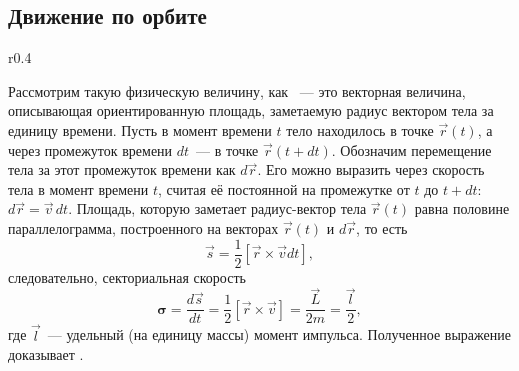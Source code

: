 \subsection{Движение по орбите}

\begin{wrapfigure}[8]{r}{0.4\tw}
	\centering
	\vspace{-0.75pc}
	\caption{}
\end{wrapfigure}
Рассмотрим такую физическую величину, как ~--- это векторная величина, описывающая ориентированную площадь, заметаемую радиус вектором тела за единицу времени. Пусть в момент времени $t$ тело находилось в точке $\vec{r}(t)$, а через промежуток времени $dt$~--- в точке $\vec{r}(t + dt)$. Обозначим перемещение тела за этот промежуток времени как $d\vec{r}$. Его можно выразить через скорость тела в момент времени $t$, считая её постоянной на промежутке от $t$ до $t + dt$: $d\vec{r} = \vec{v} \,d t$. Площадь, которую заметает радиус-вектор тела $\vec{r}(t)$ равна половине параллелограмма, построенного на векторах $\vec{r}(t)$ и $d\vec{r}$, то есть
\begin{equation*}
	\vec{s} = \frac{1}{2} [\vec{r} \times \vec{v} dt],
\end{equation*}
следовательно, секториальная скорость
\begin{equation*}
	\boldsymbol{\sigma} = \frac{d \vec{s}}{dt} = \frac{1}{2} [\vec{r} \times \vec{v}]  = \frac{\vec{L}}{2m} = \frac{\vec{l}}{2},
\end{equation*}
где $\vec{l}$~--- удельный (на единицу массы) момент импульса. Полученное выражение доказывает .

